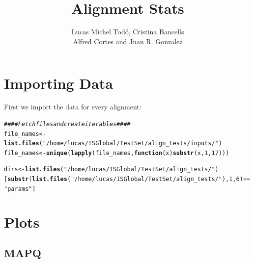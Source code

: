 \documentclass[12pt, a4paper]{article}\usepackage[]{graphicx}\usepackage[]{color}
\title{\textbf{\Large Alignment Stats}}
\author {Lucas Michel Todó, Cristina Bancells\\
Alfred Cortes and Juan R. Gonzalez}
\affil{Barcelona Global Health Institute (ISGlobal), Campus PRBB}
\makeatletter
\newcommand{\hlnum}[1]{\textcolor[rgb]{0.686,0.059,0.569}{#1}}%
\newcommand{\hlstr}[1]{\textcolor[rgb]{0.192,0.494,0.8}{#1}}%
\newcommand{\hlcom}[1]{\textcolor[rgb]{0.678,0.584,0.686}{\textit{#1}}}%
\newcommand{\hlopt}[1]{\textcolor[rgb]{0,0,0}{#1}}%
\newcommand{\hlstd}[1]{\textcolor[rgb]{0.345,0.345,0.345}{#1}}%
\newcommand{\hlkwa}[1]{\textcolor[rgb]{0.161,0.373,0.58}{\textbf{#1}}}%
\newcommand{\hlkwb}[1]{\textcolor[rgb]{0.69,0.353,0.396}{#1}}%
\newcommand{\hlkwc}[1]{\textcolor[rgb]{0.333,0.667,0.333}{#1}}%
\newcommand{\hlkwd}[1]{\textcolor[rgb]{0.737,0.353,0.396}{\textbf{#1}}}%
\newenvironment{kframe}{%
 \def\at@end@of@kframe{}%
 \ifinner\ifhmode%
  \def\at@end@of@kframe{\end{minipage}}%
  \begin{minipage}{\columnwidth}%
 \fi\fi%
 \def\FrameCommand##1{\hskip\@totalleftmargin \hskip-\fboxsep
 \colorbox{shadecolor}{##1}\hskip-\fboxsep
     \hskip-\linewidth \hskip-\@totalleftmargin \hskip\columnwidth}%
 \MakeFramed {\advance\hsize-\width
   \@totalleftmargin\z@ \linewidth\hsize
   \@setminipage}}%
 {\par\unskip\endMakeFramed%
 \at@end@of@kframe}
\newenvironment{knitrout}{}{} %
\makeatother
\begin{document}
	
\maketitle
\tableofcontents
\newpage



\section{Importing Data}

First we import the data for every alignment:
\begin{knitrout}
\color{fgcolor}\begin{kframe}
\begin{alltt}
\hlcom{####  Fetch files and create iterables ####}
\hlstd{file_names} \hlkwb{<-} \hlkwd{list.files}\hlstd{(}\hlstr{"/home/lucas/ISGlobal/TestSet/align_tests/inputs/"}\hlstd{)}
\hlstd{file_names} \hlkwb{<-} \hlkwd{unique}\hlstd{(}\hlkwd{lapply}\hlstd{(file_names,} \hlkwa{function}\hlstd{(}\hlkwc{x}\hlstd{)} \hlkwd{substr}\hlstd{(x,}\hlnum{1}\hlstd{,}\hlnum{17}\hlstd{)))}

\hlstd{dirs} \hlkwb{<-} \hlkwd{list.files}\hlstd{(}\hlstr{"/home/lucas/ISGlobal/TestSet/align_tests/"}\hlstd{)[}\hlkwd{substr}\hlstd{(}\hlkwd{list.files}\hlstd{(}\hlstr{"/home/lucas/ISGlobal/TestSet/align_tests/"}\hlstd{),}\hlnum{1}\hlstd{,}\hlnum{6}\hlstd{)} \hlopt{==} \hlstr{"params"}\hlstd{]}
\end{alltt}
\end{kframe}
\end{knitrout}

\section{Plots}
\subsection{MAPQ}
\end{document}
